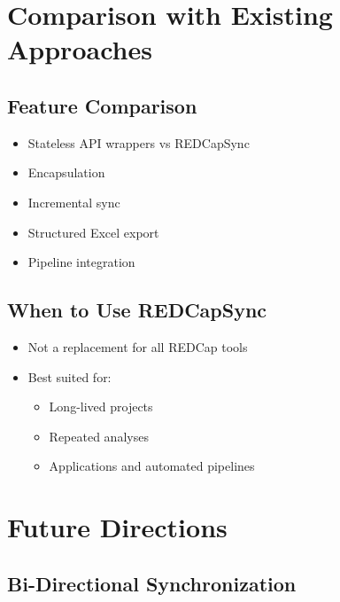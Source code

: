 \section{Comparison with Existing Approaches}\label{comparison-with-existing-approaches}

\subsection{Feature Comparison}\label{feature-comparison}

\begin{itemize}
\tightlist
\item
  Stateless API wrappers vs REDCapSync\\
\item
  Encapsulation\\
\item
  Incremental sync\\
\item
  Structured Excel export\\
\item
  Pipeline integration
\end{itemize}

\subsection{When to Use REDCapSync}\label{when-to-use-redcapsync}

\begin{itemize}
\tightlist
\item
  Not a replacement for all REDCap tools\\
\item
  Best suited for:

  \begin{itemize}
  \tightlist
  \item
    Long-lived projects\\
  \item
    Repeated analyses\\
  \item
    Applications and automated pipelines
  \end{itemize}
\end{itemize}

\section{Future Directions}\label{future-directions}

\subsection{Bi-Directional Synchronization}\label{bi-directional-synchronization}

